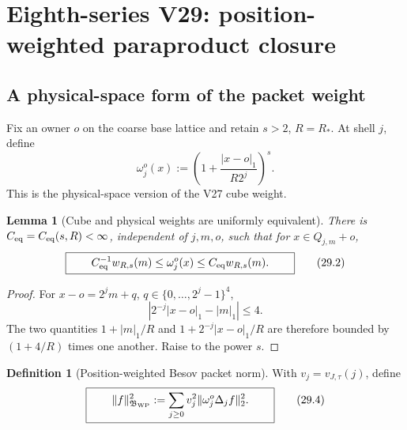 \documentclass[11pt,oneside]{book}
\newtheorem{lemma}[theorem]{Lemma}
\theoremstyle{definition}
\newtheorem{definition}[theorem]{Definition}
\theoremstyle{remark}
\begin{document}


\section{Eighth-series V29: position-weighted paraproduct closure}

\subsection{A physical-space form of the packet weight}

Fix an owner \(o\) on the coarse base lattice and retain
\(s>2\), \(R=R_*\).  At shell \(j\), define
\[
 \omega_j^o(x):=
 \left(1+\frac{|x-o|_1}{R2^j}\right)^s.                           \tag{29.1}
\]
This is the physical-space version of the V27 cube weight.

\begin{lemma}[Cube and physical weights are uniformly equivalent]
\label{lem:e8v29-weight-equivalence}
There is \(C_{\rm eq}=C_{\rm eq}(s,R)<\infty\), independent of
\(j,m,o\), such that for \(x\in Q_{j,m}+o\),
\[
\boxed{\qquad
 C_{\rm eq}^{-1}w_{R,s}(m)
 \leq\omega_j^o(x)
 \leq C_{\rm eq}w_{R,s}(m).
\qquad}                                                           \tag{29.2}
\]
\end{lemma}

\begin{proof}
For \(x-o=2^jm+q\), \(q\in\{0,\ldots,2^j-1\}^4\),
\[
 \left|2^{-j}|x-o|_1-|m|_1\right|\leq4.                          \tag{29.3}
\]
The two quantities \(1+|m|_1/R\) and
\(1+2^{-j}|x-o|_1/R\) are therefore bounded by
\((1+4/R)\) times one another.  Raise to the power \(s\).
\end{proof}

\begin{definition}[Position-weighted Besov packet norm]
\label{def:e8v29-BWP}
With \(v_j=v_{J,\tau}(j)\), define
\[
\boxed{\qquad
 \|f\|_{\mathfrak B_{\rm WP}}^2
 :=\sum_{j\geq0}v_j^2
       \|\omega_j^o\Delta_jf\|_2^2.
\qquad}                                                           \tag{29.4}
\]
\end{definition}
\end{document}
